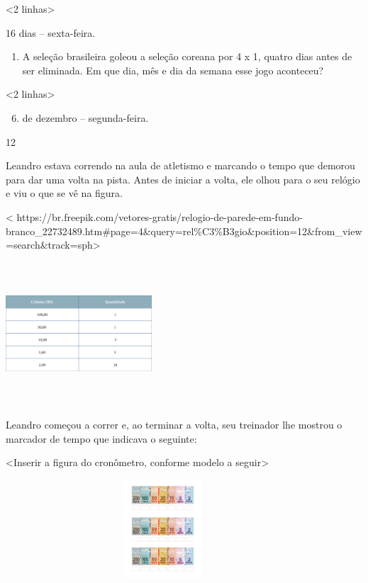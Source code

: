 {{{{{\textless{}2 linhas\textgreater{}

16 dias -- sexta-feira.

\begin{enumerate}
\def\labelenumi{\alph{enumi})}
\item
  A seleção brasileira goleou a seleção coreana por 4 x 1, quatro dias
  antes de ser eliminada. Em que dia, mês e dia da semana esse jogo
  aconteceu?
\end{enumerate}

\textless{}2 linhas\textgreater{}

\begin{enumerate}
\setcounter{enumi}{5}
\item
  de dezembro -- segunda-feira.
\end{enumerate}

\num{12}

Leandro estava correndo na aula de atletismo e marcando o tempo que
demorou para dar uma volta na pista. Antes de iniciar a volta, ele olhou
para o seu relógio e viu o que se vê na figura.

\textless{}
https://br.freepik.com/vetores-gratis/relogio-de-parede-em-fundo-branco\_22732489.htm\#page=4\&query=rel\%C3\%B3gio\&position=12\&from\_view=search\&track=sph\textgreater{}

\includegraphics[width=2.14583in,height=2.10113in]{media/image66.png}

Leandro começou a correr e, ao terminar a volta, seu treinador lhe
mostrou o marcador de tempo que indicava o seguinte:

\textless{}Inserir a figura do cronômetro, conforme modelo a
seguir\textgreater{}

\includegraphics[width=4.61458in,height=1.43750in]{media/image67.png}

}}}}}
